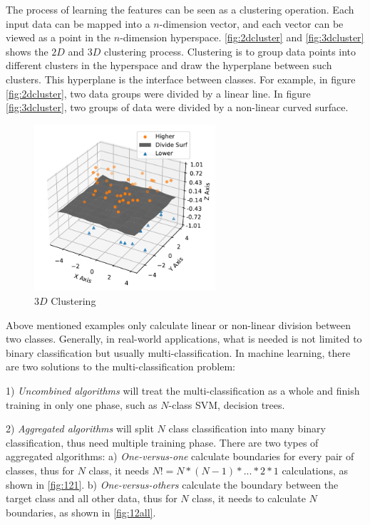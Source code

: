 \begin{spacing}{1.5}
The process of learning the features can be seen as a clustering operation. Each input data can be mapped into a $n$-dimension vector, and each vector can be viewed as a point in the $n$-dimension hyperspace. \autoref{fig:2dcluster} and \autoref{fig:3dcluster} shows the $2D$ and $3D$ clustering process. Clustering is to group data points into different clusters in the hyperspace and draw the hyperplane between such clusters. This hyperplane is the interface between classes. For example, in figure \autoref{fig:2dcluster}, two data groups were divided by a linear line. In figure \autoref{fig:3dcluster}, two groups of data were divided by a non-linear curved surface.

% 

\begin{figure}[ht]
\centering
\includegraphics[width=0.6\textwidth, fbox]{Chapter2/3dcluster.pdf}
\caption{$3D$ Clustering}
\label{fig:3dcluster} 
\end{figure}

Above mentioned examples only calculate linear or non-linear division between two classes. Generally, in real-world applications, what is needed is not limited to binary classification but usually multi-classification. In machine learning, there are two solutions to the multi-classification problem: 

1) \textit{Uncombined algorithms} will treat the multi-classification as a whole and finish training in only one phase, such as $N$-class SVM, decision trees. 

2) \textit{Aggregated algorithms} will split $N$ class classification into many binary classification, thus need multiple training phase. There are two types of aggregated algorithms: a) \textit{One-versus-one} calculate boundaries for every pair of classes, thus for $N$ class, it needs $N!=N*(N-1)*...*2*1$ calculations, as shown in \autoref{fig:121}. b) \textit{One-versus-others} calculate the boundary between the target class and all other data, thus for $N$ class, it needs to calculate $N$ boundaries, as shown in \autoref{fig:12all}. 


\end{spacing}
